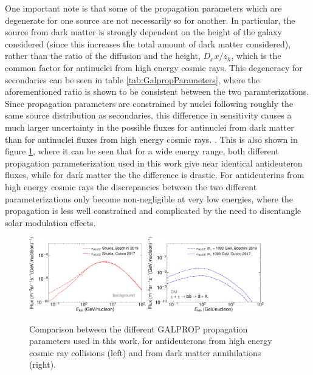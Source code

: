 One important note is that some of the propagation parameters which are degenerate for one source are not necessarily so for another. In particular, the source from dark matter is strongly dependent on the height of the galaxy considered (since this increases the total amount of dark matter considered), rather than the ratio of the diffusion and the height, $D_xx/z_h$, which is the common factor for antinuclei from high energy cosmic rays. This degeneracy for secondaries can be seen in table \ref{tab:GalpropParameters}, where the aforementioned  ratio is shown to be consistent between the two paramterizations. Since propagation parameters are constrained by nuclei following roughly the same source distribution as secondaries, this difference in sensitivity causes a much larger uncertainty in the possible fluxes for antinuclei from dark matter than for antinuclei fluxes from high energy cosmic rays. \cite{}. This is also shown in figure \ref{fig:ComparisonPropagation}, where it can be seen that for a wide energy range, both different propagation parameterization used in this work give near identical antideuteron fluxes, while for dark matter the the difference is drastic. For antideuterins from high energy cosmic rays the discrepancies between the two different parameterizations only become non-negligible at very low energies, where the propagation is less well constrained and complicated by the need to disentangle solar modulation effects. 

\begin{figure}
    \centering
    \includegraphics[width=0.45\textwidth]{figures/ComparisonPropagationBoschini.pdf}
    \includegraphics[width=0.45\textwidth]{figures/ComparisonPropagationBoschiniDM.pdf}
    \caption{Comparison between the different GALPROP propagation parameters used in this work, for antideuterons from high energy cosmic ray collisions (left) and from dark matter annihilations (right).}
    \label{fig:ComparisonPropagation}
\end{figure}


